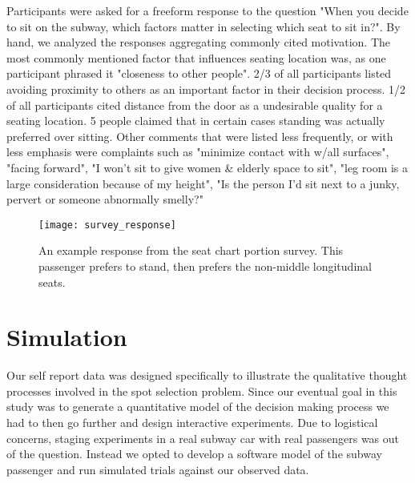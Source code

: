 \documentclass{acm_proc_article-sp}
\begin{document}
Participants were asked for a freeform response to the question "When you decide to sit on the subway, which factors matter in selecting which seat to sit in?". By hand, we analyzed the responses aggregating commonly cited motivation. The most commonly mentioned factor that influences seating location was, as one participant phrased it "closeness to other people". 2/3 of all participants listed avoiding proximity to others as an important factor in their decision process. 1/2 of all participants cited distance from the door as a undesirable quality for a seating location. 5 people claimed that in certain cases standing was actually preferred over sitting. Other comments that were listed less frequently, or with less emphasis were complaints such as "minimize contact with w/all surfaces", "facing forward", "I won't sit to give women \& elderly space to sit", "leg room is a large consideration because of my height", "Is the person I'd sit next to a junky, pervert or someone abnormally smelly?"

\begin{figure}[h!]
\texttt{[image: survey\_response]}
\caption{An example response from the seat chart portion survey. This passenger prefers to stand, then prefers the non-middle longitudinal seats.}
\end{figure}

\section{Simulation}
Our self report data was designed specifically to illustrate the qualitative thought processes involved in the spot selection problem. Since our eventual goal in this study was to generate a quantitative model of the decision making process we had to then go further and design interactive experiments. Due to logistical concerns, staging experiments in a real subway car with real passengers was out of the question. Instead we opted to develop a software model of the subway passenger and run simulated trials against our observed data.
\end{document}
